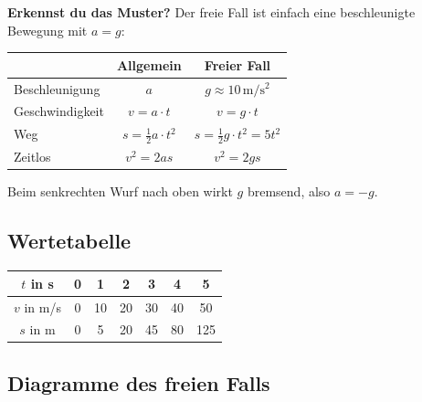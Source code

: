 \documentclass[11pt,a4paper]{article}
\begin{document}
\begin{tcolorbox}[colback=merkegreen!5, colframe=merkegreen, boxrule=0.5pt]
\textbf{Erkennst du das Muster?} Der freie Fall ist einfach eine beschleunigte Bewegung mit $a = g$:

\begin{center}
\renewcommand{\arraystretch}{1.4}
\begin{tabular}{|l|c|c|}
\hline
\rowcolor{merkegreen!20}
& \textbf{Allgemein} & \textbf{Freier Fall} \\
\hline
Beschleunigung & $a$ & $g \approx 10\,\mathrm{m/s^2}$ \\
\hline
Geschwindigkeit & $v = a \cdot t$ & $v = g \cdot t$ \\
\hline
Weg & $s = \frac{1}{2} a \cdot t^2$ & $s = \frac{1}{2} g \cdot t^2 = 5t^2$ \\
\hline
Zeitlos & $v^2 = 2as$ & $v^2 = 2gs$ \\
\hline
\end{tabular}
\end{center}
Beim senkrechten Wurf nach oben wirkt $g$ bremsend, also $a = -g$.
\end{tcolorbox}

\subsection{Wertetabelle}

\begin{center}
\begin{tabular}{|c|c|c|c|c|c|c|}
\hline
\rowcolor{lightblue}
$t$ in s & 0 & 1 & 2 & 3 & 4 & 5 \\
\hline
$v$ in m/s & 0 & 10 & 20 & 30 & 40 & 50 \\
\hline
$s$ in m & 0 & 5 & 20 & 45 & 80 & 125 \\
\hline
\end{tabular}
\end{center}

\subsection{Diagramme des freien Falls}

\begin{center}
\end{center}
\end{document}
